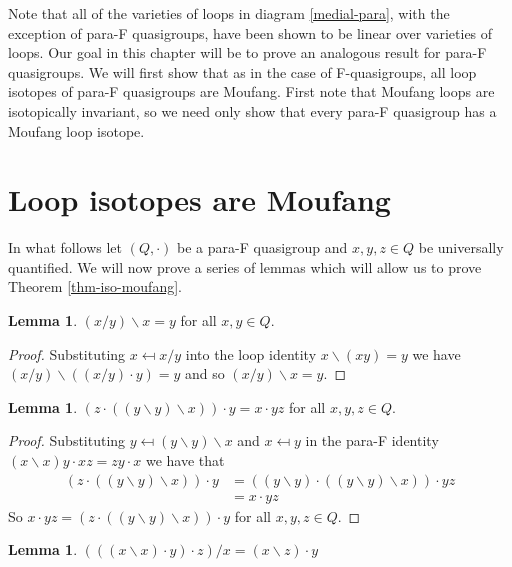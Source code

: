 \documentclass[12pt]{report}
\theoremstyle{definition}
\newtheorem{lem}[thm]{Lemma}
\newcommand{\ldv}{\backslash}       %
\newcommand{\rdv}{/}                %
\begin{document}
Note that all of the varieties of loops in diagram \ref{medial-para}, with the exception of para-F
  quasigroups, have been shown to be linear over varieties of loops. Our goal in this chapter will
  be to prove an analogous result for para-F quasigroups. We will first show that as in the case of
  F-quasigroups, all loop isotopes of para-F quasigroups are Moufang. First note that Moufang loops
  are isotopically invariant, so we need only show that every para-F quasigroup has a Moufang loop isotope.

\section{Loop isotopes are Moufang}

In what follows let $(Q, \cdot)$ be a para-F quasigroup and $x, y, z\in Q$ be universally quantified.
  We will now prove a series of lemmas which will allow us to prove Theorem \ref{thm-iso-moufang}.

\begin{lem}\label{lem-divs}
  $(x\rdv y)\ldv x = y$ for all $x, y\in Q$.
\end{lem}

\begin{proof}
  Substituting $x \mapsfrom x/y$ into the loop identity $x\ldv(xy) = y$ we have
    $(x/y)\ldv((x/y)\cdot y) = y$ and so $(x/y)\ldv x = y$.
\end{proof}

\begin{lem}\label{M-15}
  $(z\cdot((y\ldv y)\ldv x))\cdot y = x\cdot yz$ for all $x, y, z\in Q$.
\end{lem}

\begin{proof}
  Substituting $y \mapsfrom (y\ldv y)\ldv x$ and $x \mapsfrom y$ in the para-F identity
    $(x\ldv x)y \cdot xz = zy\cdot x$ we have that
  \begin{align*}
    (z\cdot ((y\ldv y)\ldv x))\cdot y &= ((y\ldv y)\cdot((y\ldv y)\ldv x))\cdot yz\\
    &= x\cdot yz
  \end{align*}
  So $x\cdot yz = (z\cdot ((y\ldv y)\ldv x))\cdot y$ for all $x, y, z\in Q$.
\end{proof}

\begin{lem}\label{M-23}
  $(((x\ldv x)\cdot y)\cdot z)/x = (x\ldv z)\cdot y$
\end{lem}
\end{document}
